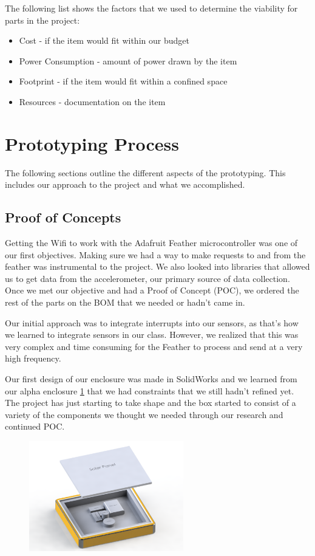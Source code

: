 \documentclass[11pt]{article}
\begin{document}
The following list shows the factors that we used to determine the viability for parts in the project:
\begin{itemize}
\item Cost - if the item would fit within our budget
\item Power Consumption - amount of power drawn by the item
\item Footprint - if the item would fit within a confined space
\item Resources - documentation on the item 
\end{itemize}

\section{Prototyping Process}

The following sections outline the different aspects of the prototyping. This includes our approach to the project and what we accomplished.

\subsection{Proof of Concepts}

Getting the Wifi to work with the Adafruit Feather microcontroller was one of our first objectives. Making sure we had a way to make requests to and from the feather was instrumental to the project. We also looked into libraries that allowed us to get data from the accelerometer, our primary source of data collection. Once we met our objective and had a Proof of Concept (POC), we ordered the rest of the parts on the BOM that we needed or hadn't came in. 
	
Our initial approach was to integrate interrupts into our sensors, as that's how we learned to integrate sensors in our class. However, we realized that this was very complex and time consuming for the Feather to process and send at a very high frequency.
	
Our first design of our enclosure was made in SolidWorks and we learned from our alpha enclosure \ref{fig:alpha_enclosure} that we had constraints that we still hadn't refined yet. The project has just starting to take shape and the box started to consist of a variety of the components we thought we needed through our research and continued POC. 

\begin{figure}[H]
\centering
\includegraphics[width=0.6\textwidth]{alpha_enclosure}
\caption{}
\label{fig:alpha_enclosure}
\end{figure}
\end{document}
